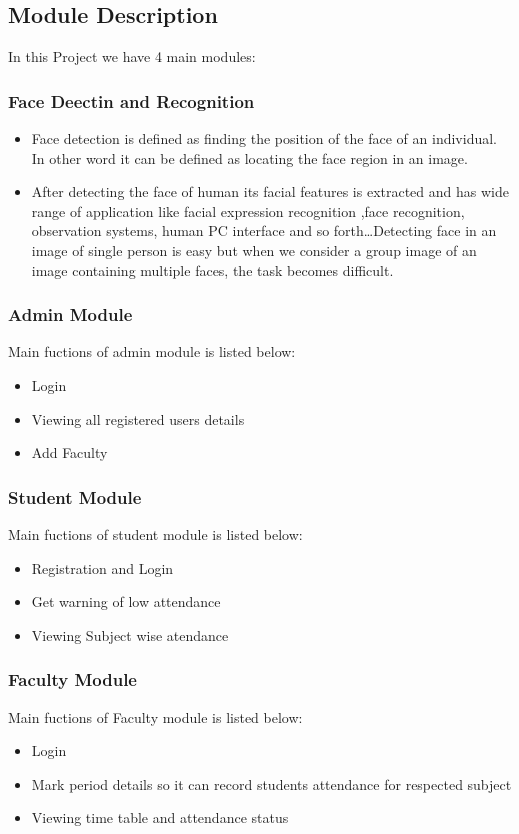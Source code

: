 \documentclass[a4paper, 12pt]{report}
\begin{document}
\subsection{Module Description}
\fontsize{12pt}{12pt}\selectfont
In this Project we have 4 main modules:

\subsubsection{Face Deectin and Recognition}
\begin{itemize}\item
Face detection is defined as finding the position of the face of an individual. In other word it can be defined as locating the face region in an image. \item
After detecting the face of human its facial features is extracted and has wide range of application like facial expression recognition ,face recognition, observation systems, human PC interface and so forth…Detecting face in an image of single person is easy but when we consider a group image of an image containing multiple faces, the task becomes difficult.
\end{itemize}
\subsubsection{Admin Module}
\fontsize{12pt}{12pt}\selectfont
Main fuctions of admin module is listed below: 
 \begin{itemize}
	\item Login
	\item Viewing all registered users details
	\item Add Faculty
\end{itemize}

\subsubsection{Student Module}
\fontsize{12pt}{12pt}\selectfont
Main fuctions of student module is listed below: 
\begin{itemize}
	\item Registration and Login
	\item Get warning of low attendance
	\item Viewing Subject wise atendance
\end{itemize}

\subsubsection{Faculty Module}
\fontsize{12pt}{12pt}\selectfont
Main fuctions of Faculty module is listed below: 
\begin{itemize}
	\item Login
	\item Mark period details so it can record students attendance for respected subject
	\item Viewing time table and attendance status
\end{itemize}
\end{document}
